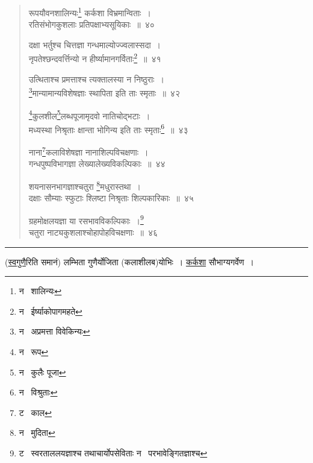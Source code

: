 \documentclass[11pt, openany]{book}
\begin{document}
\begin{quote}
{\na रूपयौवनशालिन्यः\renewcommand{\thefootnote}{1}\footnote{न \textendash\  शालिन्यः} कर्कशा विभ्रमान्विताः~।\\
रतिसंभोगकुशलाः प्रतिपक्षाभ्यसूयिकाः~॥~४०

दक्षा भर्तुश्च चित्तज्ञा गन्धमाल्योज्ज्वलास्सदा~।\\
नृपतेश्छन्दवर्त्तिन्यो न हीर्ष्यामानगर्विताः\renewcommand{\thefootnote}{2}\footnote{न \textendash\  ईर्ष्याकोपागमहते}~॥~४१

उत्थिताश्च प्रमत्ताश्च त्यक्तालस्या न निष्ठुराः~।\\
\renewcommand{\thefootnote}{3}\footnote{न \textendash\  अप्रमत्ता विवेकिन्यः}मान्यामान्यविशेषज्ञाः स्थापिता इति ताः स्मृताः~॥~४२

\renewcommand{\thefootnote}{4}\footnote{न \textendash\  रूप}कुलशील\renewcommand{\thefootnote}{5}\footnote{न \textendash\  कुलैः पूजा}लब्धपूजामृदवो नातिचोद्भटाः~।\\
मध्यस्था निश्रृताः क्षान्ता भोगिन्य इति ताः स्मृताः\renewcommand{\thefootnote}{6}\footnote{न \textendash\  विश्रुताः}~॥~४३

नाना\renewcommand{\thefootnote}{7}\footnote{ट \textendash\  काल}कलाविशेषज्ञा नानाशिल्पविचक्षणाः~।\\
गन्धपुष्पविभागज्ञा लेख्यालेख्यविकल्पिकाः~॥~४४

शयनासनभागज्ञाश्चतुरा \renewcommand{\thefootnote}{8}\footnote{न \textendash\  मुदिता}मधुरास्तथा~।\\
दक्षाः सौम्याः स्फुटाः श्लिष्टा निश्रृताः शिल्पकारिकाः~॥~४५

ग्रहमोक्षलयज्ञा या रसभावविकल्पिकाः~।\renewcommand{\thefootnote}{9}\footnote{ट \textendash\  स्वरताललयज्ञाश्च तथाचार्योपसेविताः न \textendash\  परभावेङ्गितज्ञाश्च}\\
चतुरा नाट्यकुशलाश्चोहापोहविचक्षणाः~॥~४६}
\end{quote}

\hrule

\vspace{2mm}
\noindent
(\underline{स्वगुणै}रिति समानं) लम्भिता गुणैर्योजिता (कलाशीलब)योभिः~। \underline{कर्कशा} सौभाग्यगर्वेण~।

\newpage
\end{document}
